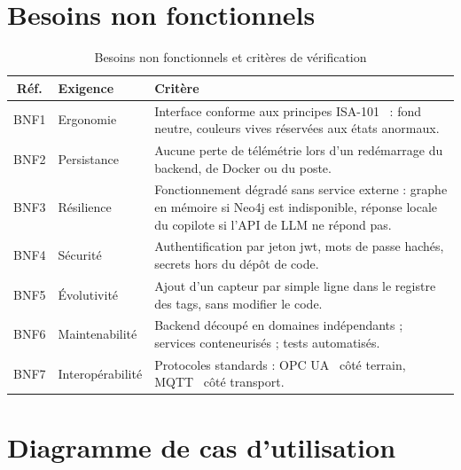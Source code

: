 \section{Besoins non fonctionnels}
\begin{table}[H]
\centering
\caption{Besoins non fonctionnels et critères de vérification}
\label{tab:bnf}
\begin{tabularx}{\textwidth}{c l X}
\toprule
\textbf{Réf.} & \textbf{Exigence} & \textbf{Critère} \\
\midrule
BNF1 & Ergonomie & Interface conforme aux principes ISA-101~\cite{isa101} : fond neutre, couleurs vives réservées aux états anormaux. \\
BNF2 & Persistance & Aucune perte de télémétrie lors d'un redémarrage du backend, de Docker ou du poste. \\
BNF3 & Résilience & Fonctionnement dégradé sans service externe : graphe en mémoire si Neo4j est indisponible, réponse locale du copilote si l'API de LLM ne répond pas. \\
BNF4 & Sécurité & Authentification par jeton \gls{jwt}, mots de passe hachés, secrets hors du dépôt de code. \\
BNF5 & Évolutivité & Ajout d'un capteur par simple ligne dans le registre des tags, sans modifier le code. \\
BNF6 & Maintenabilité & Backend découpé en domaines indépendants ; services conteneurisés ; tests automatisés. \\
BNF7 & Interopérabilité & Protocoles standards : OPC UA~\cite{iec62541} côté terrain, MQTT~\cite{mqtt5} côté transport. \\
\bottomrule
\end{tabularx}
\end{table}

\section{Diagramme de cas d'utilisation}

